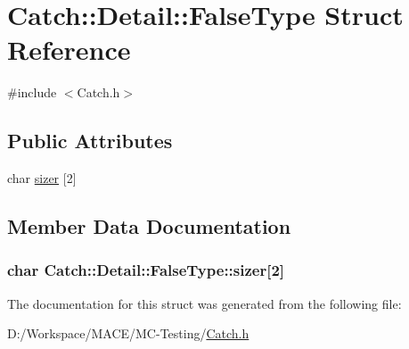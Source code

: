 \hypertarget{struct_catch_1_1_detail_1_1_false_type}{}\section{Catch\+:\+:Detail\+:\+:False\+Type Struct Reference}
\label{struct_catch_1_1_detail_1_1_false_type}


{\ttfamily \#include $<$Catch.\+h$>$}

\subsection*{Public Attributes}
\begin{DoxyCompactItemize}
\item 
char \hyperlink{struct_catch_1_1_detail_1_1_false_type_abc1a730e197d6f7750ae8aaf47b63477}{sizer} \mbox{[}2\mbox{]}
\end{DoxyCompactItemize}


\subsection{Member Data Documentation}
\subsubsection[{\texorpdfstring{sizer}{sizer}}]{\setlength{\rightskip}{0pt plus 5cm}char Catch\+::\+Detail\+::\+False\+Type\+::sizer\mbox{[}2\mbox{]}}\hypertarget{struct_catch_1_1_detail_1_1_false_type_abc1a730e197d6f7750ae8aaf47b63477}{}\label{struct_catch_1_1_detail_1_1_false_type_abc1a730e197d6f7750ae8aaf47b63477}


The documentation for this struct was generated from the following file\+:\begin{DoxyCompactItemize}
\item 
D\+:/\+Workspace/\+M\+A\+C\+E/\+M\+C-\/\+Testing/\hyperlink{_catch_8h}{Catch.\+h}\end{DoxyCompactItemize}
